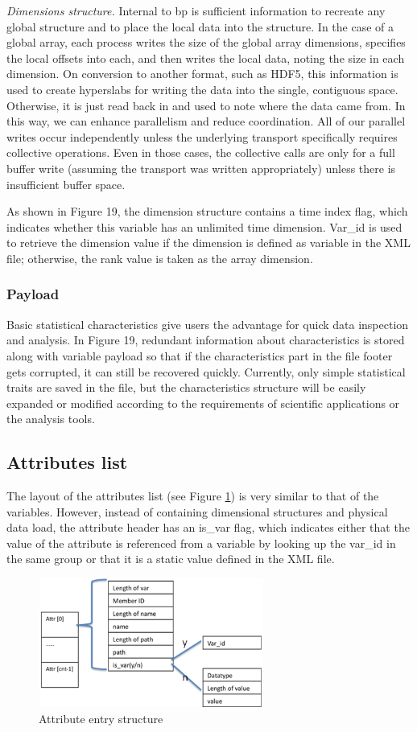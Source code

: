 \emph{Dimensions structure.} 
Internal to bp is sufficient information to recreate any global structure and to 
place the local data into the structure. In the case of a global array, each process 
writes the size of the global array dimensions, specifies the local offsets into 
each, and then writes the local data, noting the size in each dimension. On conversion 
to another format, such as HDF5, this information is used to create hyperslabs 
for writing the data into the single, contiguous space. Otherwise, it is just read 
back in and used to note where the data came from. In this way, we can enhance 
parallelism and reduce coordination. All of our parallel writes occur independently 
unless the underlying transport specifically requires collective operations. Even 
in those cases, the collective calls are only for a full buffer write (assuming 
the transport was written appropriately) unless there is insufficient buffer space. 

As shown in Figure 19, the dimension structure contains a time index flag, which 
indicates whether this variable has an unlimited time dimension. Var\_id is used 
to retrieve the dimension value if the dimension is defined as variable in the 
XML file; otherwise, the rank value is taken as the array dimension.  

\subsubsection{Payload}

Basic statistical characteristics give users the advantage for quick data inspection 
and analysis. In Figure 19, redundant information about characteristics is stored 
along with variable payload so that if the characteristics part in the file footer 
gets corrupted, it can still be recovered quickly. Currently, only simple statistical 
traits are saved in the file, but the characteristics structure will be easily 
expanded or modified according to the requirements of scientific applications or 
the analysis tools. 

\subsection{Attributes list}

The layout of the attributes list (see Figure \ref{fig:attribute-entry-struct}) 
is very similar to that of the 
variables. However, instead of containing dimensional structures and physical data 
load, the attribute header has an is\_var flag, which indicates either that the 
value of the attribute is referenced from a variable by looking up the var\_id 
in the same group or that it is a static value defined in the XML file. 

\begin{figure}[htbp]
\begin{center}
\includegraphics[width=210pt, height=120pt]{figures/attributes-entry-structure.png}
\caption{Attribute entry structure}
\label{fig:attribute-entry-struct}
\end{center}
\end{figure}

